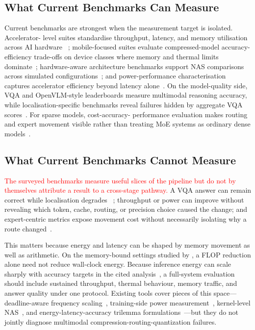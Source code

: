 \documentclass[10pt]{article}
\begin{document}
\subsection{What Current Benchmarks Can Measure}

Current benchmarks are strongest when the measurement target is isolated.  Accelerator-
level suites standardise throughput, latency, and memory utilisation across AI hardware
~\citep{chittyvenkata2024llminferencebenchinferencebenchmarkinglarge}; mobile-focused suites evaluate compressed-model
accuracy-efficiency trade-offs on device classes where memory and thermal limits
dominate~\citep{li2025palmbenchcomprehensivebenchmarkcompressed}; hardware-aware architecture benchmarks support NAS
comparisons across simulated configurations~\citep{sukthanker2024hwgptbenchhardwareawarearchitecturebenchmark}; and power-performance
characterisation captures accelerator efficiency beyond latency alone~\citep{John_2024}.
On the model-quality side, VQA and OpenVLM-style leaderboards measure multimodal
reasoning accuracy, while localisation-specific benchmarks reveal failures hidden by
aggregate VQA scores~\citep{chiang2024locatebenchevaluatinglocatingability}.  For sparse models, cost-accuracy-
performance evaluation makes routing and expert movement visible rather than treating
MoE systems as ordinary dense models~\citep{jiang2025moecapbenchmarkingcostaccuracy}.

\subsection{What Current Benchmarks Cannot Measure}

\textcolor{red}{The surveyed benchmarks measure useful slices of the pipeline but do
not by themselves attribute a result to a cross-stage pathway.}  A VQA
answer can remain correct while localisation degrades
~\citep{chiang2024locatebenchevaluatinglocatingability}; throughput or power can improve
without revealing which token, cache, routing, or precision choice caused the change;
and expert-centric metrics expose movement cost without necessarily isolating why a
route changed~\citep{tschand2025mlperfpowerbenchmarkingenergy,jiang2025moecapbenchmarkingcostaccuracy}.

This matters because energy and latency can be shaped by memory movement as well as
arithmetic.  On the memory-bound settings studied by
\citet{chung2026joulesgodiagnosinginference}, a FLOP reduction alone need not reduce
wall-clock energy.  Because inference energy can scale sharply with accuracy targets in
the cited analysis~\citep{yang2024doubleexponentialincreasesinferenceenergy}, a
full-system evaluation should include sustained throughput, thermal behaviour,
memory traffic, and answer quality under one protocol.  Existing tools cover pieces of
this space---deadline-aware frequency scaling~\citep{yan2024polythrottleenergyefficientneuralnetwork}, training-side
power measurement~\citep{Latif_2025}, kernel-level NAS~\citep{la2025kernellevelenergyefficientneuralarchitecture}, and
energy-latency-accuracy trilemma formulations~\citep{tian2024energyefficiencynavigatingtrilemmaenergy}---but they do not
jointly diagnose multimodal compression-routing-quantization failures.
\end{document}
